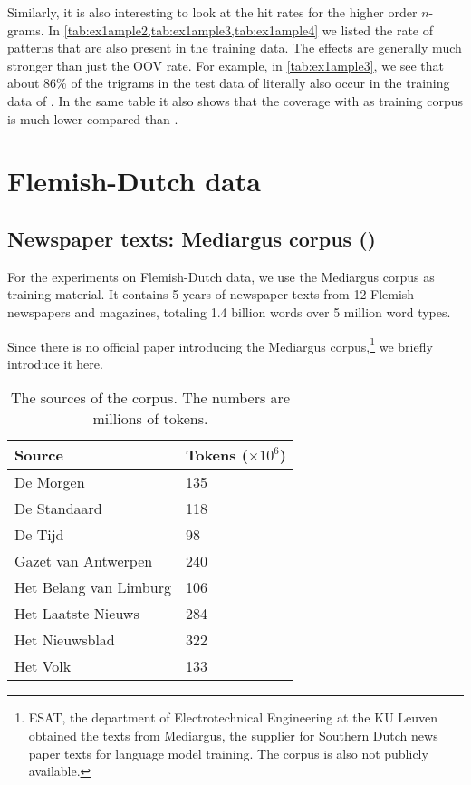 Similarly, it is also interesting to look at the hit rates for the higher order $n$-grams. In \cref{tab:ex1ample2,tab:ex1ample3,tab:ex1ample4} we listed the rate of patterns that are also present in the training data. The effects are generally much stronger than just the OOV rate. For example, in \cref{tab:ex1ample3}, we see that about 86\% of the trigrams in the test data of \obw literally also occur in the training data of \obw.
In the same table it also shows that the coverage with \emea as training corpus is much lower compared than \obw.
    
\section{Flemish-Dutch data}
\subsection{Newspaper texts: Mediargus corpus (\mediargus)}
For the experiments on Flemish-Dutch data, we use the Mediargus corpus as training material. It contains 5 years of newspaper texts from 12 Flemish newspapers and magazines, totaling 1.4 billion words over 5 million word types.

Since there is no official paper introducing the Mediargus corpus,\footnote{ESAT, the department of Electrotechnical Engineering at the KU Leuven obtained the texts from Mediargus, the supplier for Southern Dutch news paper texts for language model training. The corpus is also not publicly available.} we briefly introduce it here.

\begin{table}
	\begin{tabular}{ll}
    	Source & \thead{Tokens \\ ($\times 10^6$)} \\ \hline
    	De Morgen & 135 \\
        De Standaard & 118 \\
        De Tijd & 98 \\
        Gazet van Antwerpen & 240 \\
        Het Belang van Limburg & 106 \\
        Het Laatste Nieuws & 284 \\
        Het Nieuwsblad & 322 \\
        Het Volk & 133
    \end{tabular}
    \caption{The sources of the \mediargus corpus. The numbers are millions of tokens.}
\end{table}

